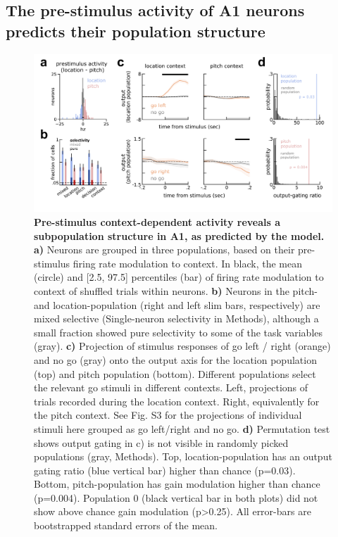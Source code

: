 \documentclass[12pt]{article}
\begin{document}
\subsection*{The pre-stimulus activity of A1 neurons predicts their population structure}


\begin{figure}
\centering
        \includegraphics[width=\textwidth]{figures/Fig3.pdf}
    \caption{\textbf{Pre-stimulus context-dependent activity reveals a subpopulation structure in A1, as predicted by the model.} \textbf{a)} Neurons are grouped in three populations, based on their pre-stimulus firing rate modulation to context. In black, the mean (circle) and [2.5, 97.5] percentiles (bar) of firing rate modulation to context of shuffled trials within neurons. \textbf{b)} Neurons in the pitch- and location-population (right and left slim bars, respectively) are mixed selective (Single-neuron selectivity in Methods), although a small fraction showed pure selectivity to some of the task variables (gray). \textbf{c)} Projection of stimulus responses of go left / right (orange) and no go (gray) onto the output axis for the location population (top) and pitch population (bottom). Different populations select the relevant go stimuli in different contexts. Left, projections of trials recorded during the location context. Right, equivalently for the pitch context. See Fig. S3 for the projections of individual stimuli here grouped as go left/right and no go. \textbf{d)} Permutation test shows output gating in c) is not visible in randomly picked populations (gray, Methods). Top, location-population has an output gating ratio (blue vertical bar) higher than chance (p=0.03). Bottom, pitch-population has gain modulation higher than chance (p=0.004). Population 0 (black vertical bar in both plots) did not show above chance gain modulation (p>0.25). All error-bars are bootstrapped standard errors of the mean. } 
    \label{fig3}
\end{figure}
\end{document}
